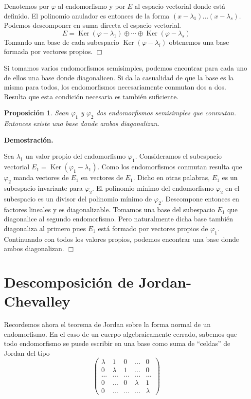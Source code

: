 \documentclass[a4paper,draft,12pt]{scrartcl}
\newtheorem{propo}[teo]{Proposición}%
\newcommand{\dem}{\noindent \textbf{Demostración. }\vspace{0.3 cm}}%
\newcommand{\fin}{ $\Box $ \vspace{0.4 cm}}
\DeclareMathOperator{\Ker}{Ker}%
\begin{document}
\smallskip

Denotemos por $\varphi$ al endomorfismo y por $E$ al espacio vectorial donde está definido.  El polinomio anulador es entonces de la forma $(x- \lambda_1) \dots(x- \lambda_s)$. Podemos descomponer en suma directa el espacio vectorial.
$$
E= \Ker(\varphi- \lambda_1) \oplus \cdots \oplus \Ker(\varphi-\lambda_s)
$$
Tomando una base de cada subespacio $\Ker(\varphi-\lambda_i)$ obtenemos una base formada por vectores propios. \fin

Si tomamos varios endomorfismos semisimples, podemos encontrar para cada uno de ellos una base donde diagonalicen.  Si da la casualidad de que la base es la misma para todos, los endomorfismos necesariamente conmutan dos a dos.  Resulta que esta condición necesaria es también suficiente.

\begin{propo}

Sean $\varphi_1$ y $\varphi_2$ dos endomorfismos semisimples que conmutan.  Entonces existe una base donde ambos diagonalizan.

\end{propo}

\dem

Sea $\lambda_1$ un valor propio del endomorfismo $\varphi_1$.  Consideramos el subespacio vectorial $E_1=\Ker(\varphi_1 - \lambda_1)$.  Como los endomorfismos conmutan resulta que $\varphi_2$ manda vectores de $E_1$ en vectores de $E_1$.  Dicho en otras palabras, $E_1$ es un subespacio invariante para $\varphi_2$. El polinomio mínimo del endomorfismo $\varphi_2$ en el subespacio es un divisor del polinomio mínimo de $\varphi_2$.  Descompone entonces en factores lineales y es diagonalizable.  Tomamos una base del subespacio $E_1$ que diagonalice al segundo endomorfismo.  Pero naturalmente dicha base también diagonaliza al primero pues $E_1$ está formado por vectores propios de $\varphi_1$.  Continuando con todos los valores propios, podemos encontrar una base donde ambos diagonalizan. \fin

\newpage

\section{Descomposición de Jordan-Chevalley}

Recordemos ahora el teorema de Jordan sobre  la forma normal de un endomorfismo. En el caso de un cuerpo algebraicamente cerrado, sabemos que todo endomorfismo se puede escribir en una base como suma de ``celdas'' de Jordan del tipo
$$
\begin{pmatrix}
\lambda & 1& 0 & \dots & 0 \\
0  & \lambda & 1 & \dots & 0 \\
\dots & \dots & \dots & \dots & \dots\\
0 & \dots & 0 & \lambda & 1 \\
0 & \dots & \dots & \dots & \lambda
\end{pmatrix}
$$
\end{document}
